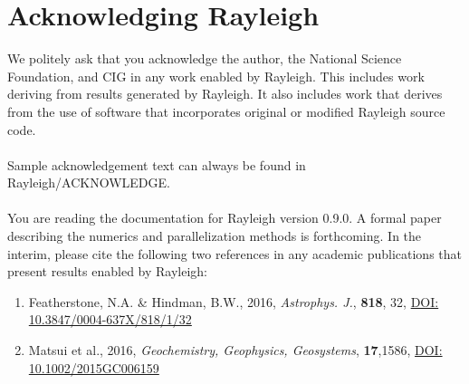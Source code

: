 \documentclass[10pt, letterpaper]{article}
\begin{document}










\section{Acknowledging Rayleigh}
We politely ask that you acknowledge the author, the National Science Foundation, and CIG in any work enabled by Rayleigh.  This includes work deriving from results generated by Rayleigh.  It also includes work that derives from the use of software that incorporates original or modified Rayleigh source code.
\\
\\
Sample acknowledgement text can always be found in Rayleigh/ACKNOWLEDGE.
\\
\\
\noindent You are reading the documentation for Rayleigh version 0.9.0.   A formal paper describing the numerics and parallelization methods is forthcoming.  In the interim, please cite the following two references in any academic publications that present results enabled by Rayleigh:
\begin{enumerate}
\item Featherstone, N.A. \& Hindman, B.W., 2016, \textit{Astrophys. J.}, \textbf{818}, 32, {\color{blue} \href{http://dx.doi.org/10.3847/0004-637X/818/1/32}{DOI: 10.3847/0004-637X/818/1/32}}
\item Matsui et al., 2016, \textit{Geochemistry, Geophysics, Geosystems}, \textbf{17},1586,  {\color{blue} \href{http://dx.doi.org/10.1002/2015GC006159}{DOI: 10.1002/2015GC006159}}
\end{enumerate}
\end{document}

